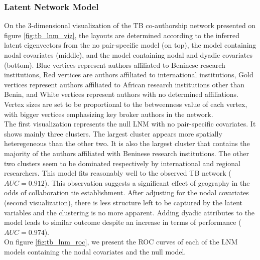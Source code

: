 \subsubsection{Latent Network Model}
\label{tb_sec:results_lnm}
On the 3-dimensional visualization of the TB co-authorship network presented on figure \ref{fig:tb_lnm_viz}, the layouts are determined according to the inferred latent eigenvectors from the no pair-specific model (on top), the model containing nodal covariates (middle), and the model containing nodal and dyadic covariates (bottom). Blue vertices represent authors affiliated to Beninese research institutions, Red vertices are authors affiliated to international institutions, Gold vertices represent authors affiliated to African research institutions other than Benin, and White vertices represent authors with no determined affiliations. Vertex sizes are set to be proportional to the betweenness value of each vertex, with bigger vertices emphasizing key broker authors in the network. \\
The first visualization represents the null LNM with no pair-specific covariates. It shows mainly three clusters. The largest cluster appears more spatially heteregeneous than the other two. It is also the largest cluster that contains the majority of the authors affiliated with Beninese research institutions. The other two clusters seem to be dominated respectively by international and regional researchers. This model fits reasonably well to the observed TB network ($AUC=0.912$).  This observation suggests a significant effect of geography in the odds of collaboration tie establishment. After adjusting for the nodal covariates (second visualization), there is less structure left to be captured by the latent variables and the clustering is no more apparent. Adding dyadic attributes to the model leads to similar outcome despite an increase in terms of performance ($AUC=0.974$). \\
On figure \ref{fig:tb_lnm_roc}, we present the ROC curves of each of the LNM models containing the nodal covariates and the null model.

